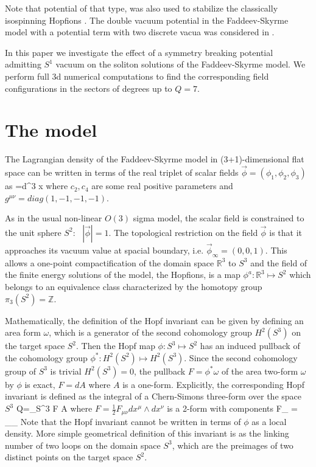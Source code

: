 \documentclass[12pt,a4paper]{article}
\begin{document}
Note that potential of that type,  was also used to stabilize
the classically isospinning Hopfions \cite{Harland:2013uk,Battye:2013xf}. The double vacuum potential in the Faddeev-Skyrme model
with a potential term with two discrete vacua was considered in \cite{Kobayashi:2013bqa}.

In this paper we investigate the effect of a symmetry breaking potential admitting
$S^1$ vacuum on the soliton solutions of the Faddeev-Skyrme model. We perform full 3d numerical computations to find the corresponding
field configurations in the sectors of degrees up to $Q=7$.





\section{The model}
The Lagrangian density of the Faddeev-Skyrme model in (3+1)-dimensional flat space can be written in terms of the real
triplet of scalar fields $\vec\phi=(\phi_1,\phi_2,\phi_3)$ as \cite{Faddeev-Hopf,Faddeev:1996zj}
\be
\label{lagr}
\CL=\int d^3 x
\ee
where $c_2,c_4$ are some real positive parameters and $g^{\mu\nu}=diag(1,-1,-1,-1)$.

As in the usual non-linear $O(3)$ sigma model,
the scalar field is constrained to the unit sphere $S^2$: ~$|\vec{\phi}|=1$.
The topological restriction on the field $\vec \phi$ is that it approaches its
vacuum value at spacial boundary, i.e. $\vec \phi_\infty = (0,0,1)$.
This allows a one-point compactification of
the domain space $\mathbb{R}^3$ to $S^3$ and
the field of the finite energy solutions of the
model, the Hopfions, is a map $\phi^a:\mathbb{R}^3 \mapsto S^2$ which belongs
to an equivalence class characterized by the homotopy group $\pi_3(S^2)=\mathbb{Z}$.

Mathematically, the definition of the Hopf invariant
can be given by defining an area form $\omega$, which is a generator of the second cohomology group
$H^2(S^3)$ on the target space $S^2$.
Then the Hopf map $\phi: S^3 \mapsto S^2$ has an induced pullback of the
cohomology group $\phi^*:H^2(S^2) \mapsto H^2(S^3)$.
Since the second cohomology group of $S^3$ is trivial $H^2(S^3)=0$,
the pullback $F=\phi^* \omega$ of the area two-form $\omega$ by $\phi$ is exact,
$F=dA$ where $A$ is a one-form. Explicitly, the corresponding  Hopf invariant is defined
as the integral of a Chern-Simons three-form over the space $S^3$
\be
Q=\int\limits_{S^3}\!\! F \wedge A \in {}
\label{Hopf-charge}
\ee
where $F=\frac12 F_{\mu\nu} dx^\mu \wedge dx^\nu$ is a 2-form with components
\be
F_{\mu\nu} = \vec\phi \cdot \partial_\mu \vec \phi \times  \partial_\nu \vec\phi
\ee
Note that the Hopf invariant cannot be written in terms of $\phi$ as a local density.
More simple geometrical definition of this invariant is as
the linking number of two loops on the domain space $S^3$, which are the preimages of two distinct points
on the target space $S^2$.
\end{document}
